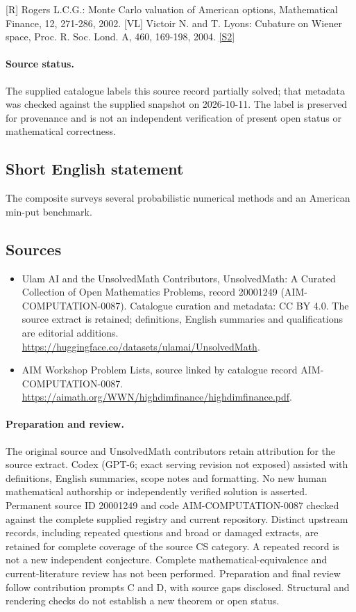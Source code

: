 \documentclass[11pt]{article}
\newcommand{\sref}[2]{\hyperlink{source:#1:#2}{[S#2]}}
\begin{document}
[R] Rogers L.C.G.: Monte Carlo valuation of American options, Mathematical Finance, 12, 271-286, 2002. [VL] Victoir N. and T. Lyons: Cubature on Wiener space, Proc. R. Soc. Lond. A, 460, 169-198, 2004. \sref{20001249}{2}
\paragraph{Source status.}
The supplied catalogue labels this source record partially solved; that metadata was checked against the supplied snapshot on 2026-10-11. The label is preserved for provenance and is not an independent verification of present open status or mathematical correctness.
\subsection{Short English statement}
The composite surveys several probabilistic numerical methods and an American min-put benchmark.
\subsection{Sources}
\begin{itemize}
\item[\hypertarget{source:20001249:1}{S1}] Ulam AI and the UnsolvedMath Contributors, UnsolvedMath: A Curated Collection of Open Mathematics Problems, record 20001249 (AIM-COMPUTATION-0087). Catalogue curation and metadata: CC BY 4.0. The source extract is retained; definitions, English summaries and qualifications are editorial additions.
\url{https://huggingface.co/datasets/ulamai/UnsolvedMath}.
\item[\hypertarget{source:20001249:2}{S2}] AIM Workshop Problem Lists, source linked by catalogue record AIM-COMPUTATION-0087.
\url{https://aimath.org/WWN/highdimfinance/highdimfinance.pdf}.
\end{itemize}
\paragraph{Preparation and review.}
The original source and UnsolvedMath contributors retain attribution for the source extract. Codex (GPT-6; exact serving revision not exposed) assisted with definitions, English summaries, scope notes and formatting. No new human mathematical authorship or independently verified solution is asserted. Permanent source ID 20001249 and code AIM-COMPUTATION-0087 checked against the complete supplied registry and current repository. Distinct upstream records, including repeated questions and broad or damaged extracts, are retained for complete coverage of the source CS category. A repeated record is not a new independent conjecture. Complete mathematical-equivalence and current-literature review has not been performed. Preparation and final review follow contribution prompts C and D, with source gaps disclosed. Structural and rendering checks do not establish a new theorem or open status.
\label{end:20001249}
\end{document}
